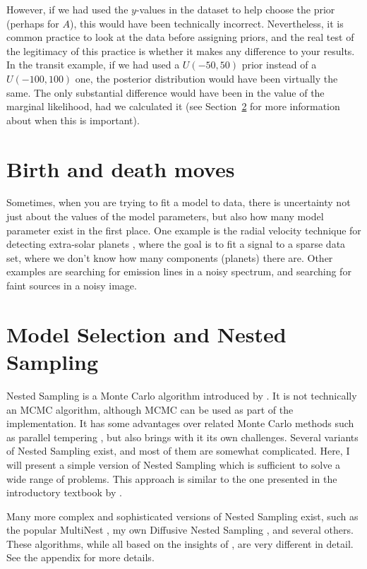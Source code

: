 However, if we had used the $y$-values in the dataset to help choose the prior
(perhaps for $A$), this would have been technically incorrect. Nevertheless,
it is common practice to look at the data before assigning priors, and the
real test of the legitimacy of this practice is whether it makes any difference
to your results. In the transit example, if we had used a $U(-50, 50)$ prior
instead of a $U(-100, 100)$ one, the posterior distribution would have been
virtually the same. The only substantial difference would have been in the
value of the marginal likelihood, had we calculated it
(see Section~\ref{sec:model_selection} for more information about when this
is important).

\section{Birth and death moves}
Sometimes, when you are trying to fit a model to data, there is uncertainty
not just about the values of the model parameters, but also how many model
parameter exist in the first place. One example is
the radial velocity technique for detecting extra-solar planets
\citep{gregory}, where the goal is to fit a signal to a sparse data set, where
we don't know how many components (planets) there are. Other examples are
searching for emission lines in a noisy spectrum, and searching for faint
sources in a noisy image.



\section{Model Selection and Nested Sampling}\label{sec:model_selection}
Nested Sampling is a Monte Carlo algorithm introduced by \citet{skilling}. It
is not technically an MCMC algorithm, although MCMC can be used as part of the
implementation. It has some advantages over related Monte Carlo methods
such as parallel tempering \citep{pt, gregory, tempering}, but
also brings with it its own challenges.
Several variants of Nested Sampling exist, and most of them are somewhat
complicated. Here, I will present a simple version of Nested Sampling which
is sufficient to solve a wide range of problems. This approach is similar to
the one presented in the introductory textbook by \citet{sivia}.

Many more complex and sophisticated versions of
Nested Sampling exist, such as the popular MultiNest \citep{multinest},
my own Diffusive Nested Sampling \citep{dnest}, and several others. These
algorithms, while all based on the insights of \citet{skilling}, are very
different in detail. See the appendix for more details.

